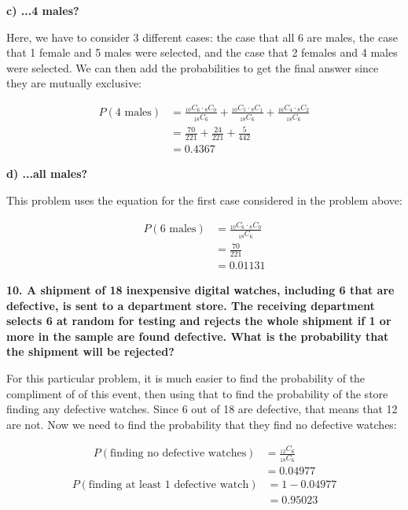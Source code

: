 \documentclass[12pt, letterpaper]{article}
\begin{document}
\qquad \textbf{c) ...4 males?}
\begin{center}
	Here, we have to consider 3 different cases: the case that all 6 are males, the case that 1 female and 5 males were selected, and the case that 2 females and 4 males were selected. We can then add the probabilities to get the final answer since they are mutually exclusive:
\end{center}
\begin{align*}
	P(\text{4 males}) &= \frac{{}_{10}C_{6} \cdot {}_{8}C_{0}}{{}_{18}C_{6}} + \frac{{}_{10}C_{5} \cdot {}_{8}C_{1}}{{}_{18}C_{6}} + \frac{{}_{10}C_{4} \cdot {}_{8}C_{2}}{{}_{18}C_{6}} \\
	&= \frac{70}{221} + \frac{24}{221} + \frac{5}{442} \\
	&= \boxed{0.4367}
\end{align*}

\pagebreak

\qquad \textbf{d) ...all males?}
\begin{center}
	This problem uses the equation for the first case considered in the problem above:
\end{center}
\begin{align*}
	P(\text{6 males}) &= \frac{{}_{10}C_{6} \cdot {}_{8}C_{0}}{{}_{18}C_{6}}\\
	&= \frac{70}{221} \\
	&= \boxed{0.01131}
\end{align*}

\textbf{10. A shipment of 18 inexpensive digital watches, including 6 that are defective, is sent to a department store. The receiving department selects 6 at random for testing and rejects the whole shipment if 1 or more in the sample are found defective. What is the probability that the shipment will be rejected?}
\begin{center}
	For this particular problem, it is much easier to find the probability of the compliment of of this event, then using that to find the probability of the store finding any defective watches. Since 6 out of 18 are defective, that means that 12 are not. Now we need to find the probability that they find no defective watches:
\end{center}
\begin{align*}
	P(\text{finding no defective watches}) &= \frac{{}_{12}C_{6}}{{}_{18}C_{6}} \\
	&= 0.04977
\end{align*}
\begin{align*}
	P(\text{finding at least 1 defective watch}) &= 1 - 0.04977 \\
	&= \boxed{0.95023}
\end{align*}
\end{document}
